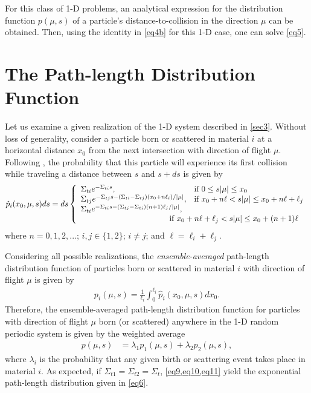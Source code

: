 \documentclass[12pt]{article}
\begin{document}
For this class of 1-D problems, an analytical expression for the distribution function $p(\mu,s)$ of a particle's distance-to-collision in the direction $\mu$ can be obtained.
Then, using the identity in \cref{eq4b} for this 1-D case, one can solve \cref{eq5}.

\section{The Path-length Distribution Function}\label{sec4}

Let us examine a given realization of the 1-D system described in \cref{sec3}.
Without loss of generality, consider a particle born or scattered in material $i$ at a horizontal distance $x_0$ from the next intersection with direction of flight $\mu$. Following \cite{nse16}, the probability that this particle will experience its first collision while traveling a distance between $s$ and $s+ds$ is given by
\begin{align}\label{eq9}
\hat p_i(x_0,\mu, s)ds = ds\left\{
\begin{array}{ll}
\Sigma_{ti}e^{-\Sigma_{ti}s}, & \text{if } 0\leq s|\mu|\leq x_0  \\
\Sigma_{tj}e^{-\Sigma_{tj}s-(\Sigma_{ti}-\Sigma_{tj})(x_0+n\ell_i)/|\mu|}, & \text{if } x_0+n\ell< s|\mu|\leq  x_0+n\ell+\ell_j \\
\Sigma_{ti}e^{-\Sigma_{ti}s-(\Sigma_{tj}-\Sigma_{ti})(n+1)\ell_j/|\mu|}, & \\
 & \hspace{-1.1cm}\text{if } x_0+n\ell+\ell_j< s|\mu|\leq x_0+(n+1)\ell
\end{array}
\right.
\end{align}
where $n=0, 1, 2, ...$; $i,j \in\{1,2\}$; $i\neq j$; and $\ell = \ell_i+\ell_j$.

Considering all possible realizations, the \textit{ensemble-averaged} path-length distribution function of particles born or scattered in material $i$ with direction of flight $\mu$ is given by
\begin{align}\label{eq10}
p_i(\mu,s) = \frac{1}{\ell_i}\int_0^{\ell_i} \hat p_i(x_0,\mu,s) dx_0.
\end{align}
Therefore, the ensemble-averaged path-length distribution function for particles with direction of flight $\mu$ born (or scattered) anywhere in the 1-D random periodic system is given by the weighted average
\begin{align}\label{eq11}
p(\mu,s) &= \lambda_1 p_1(\mu,s) + \lambda_2p_2(\mu,s),
\end{align}
where $\lambda_i$ is the probability that any given birth or scattering event takes place in material $i$.
As expected, if $\Sigma_{t1}=\Sigma_{t2}=\Sigma_t$, \cref{eq9,eq10,eq11} yield the exponential path-length distribution given in \cref{eq6}.
\end{document}
